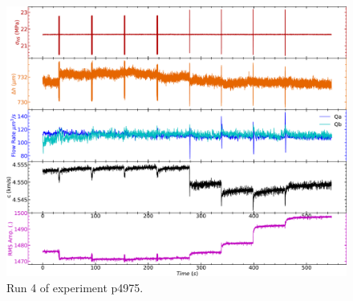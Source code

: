 \begin{figure}[ht]
	\centering
	\includegraphics[width=1\columnwidth]{NS_p4975_run4}
	\caption{Run 4 of experiment p4975.}
	\label{fig:run4_p4975}
\end{figure}

\newpage


